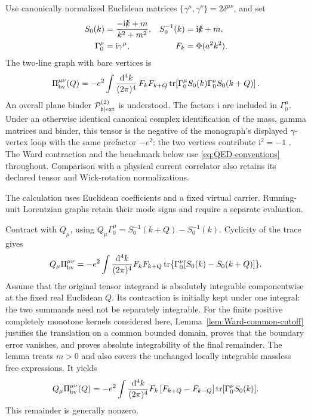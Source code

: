 \documentclass[final,5p,times,twocolumn,numbers,nopreprintline]{elsarticle}
\numberwithin{equation}{section}
\theoremstyle{definition}
\theoremstyle{remark}
\newcommand{\dd}{\mathop{}\!\mathrm d}
\newcommand{\ii}{\mathrm i}
\newcommand{\bb}{\mathfrak b}
\newcommand{\Ph}{\Phi}
\newcommand{\Tr}{\operatorname{tr}}
\begin{document}
Use canonically normalized Euclidean matrices
\(\{\gamma^\mu,\gamma^\nu\}=2\delta^{\mu\nu}\), and set
\begin{equation}
\begin{aligned}
 S_0(k)&=\frac{-\ii\slashed k+m}{k^2+m^2},&
 S_0^{-1}(k)&=\ii\slashed k+m,\\
 \Gamma_0^\mu&=\ii\gamma^\mu,&
 F_k&=\Ph(a^2k^2).
\end{aligned}
 \label{eq:QED-conventions}
\end{equation}
The two-line graph with bare vertices is
\begin{equation}
 \Pi_{\rm bv}^{\mu\nu}(Q)
 =-e^2\int\frac{\dd^4k}{(2\pi)^4}\,
 F_kF_{k+Q}
 \Tr\!\left[\Gamma_0^\mu S_0(k)
                 \Gamma_0^\nu S_0(k+Q)\right].
 \label{eq:bare-QED-loop}
\end{equation}
An overall plane binder
\(\mathcal P^{(2)}_{\bb\mid{\rm ext}}\) is understood.
The factors \(\ii\) are included in \(\Gamma_0^\mu\).
Under an otherwise identical canonical complex identification of
the mass, gamma matrices and binder, this tensor is the negative
of the monograph's displayed \(\gamma\)-vertex loop with the
same prefactor \(-e^2\): the two vertices contribute
\(\ii^2=-1\) \cite{ChiapponeMonograph}.
The Ward contraction and the benchmark below use
\eqref{eq:QED-conventions} throughout. Comparison with a physical
current correlator also retains its declared tensor and
Wick-rotation normalizations.

The calculation uses Euclidean coefficients and a fixed virtual
carrier. Running-unit Lorentzian graphs retain their mode signs
and require a separate evaluation.

Contract with \(Q_\mu\), using
\(Q_\mu\Gamma_0^\mu=S_0^{-1}(k+Q)-S_0^{-1}(k)\).
Cyclicity of the trace gives
\[
 Q_\mu\Pi_{\rm bv}^{\mu\nu}
 =-e^2\int\frac{\dd^4k}{(2\pi)^4}F_kF_{k+Q}
  \Tr\{\Gamma_0^\nu[S_0(k)-S_0(k+Q)]\}.
\]
Assume that the original tensor integrand is absolutely integrable
componentwise at the fixed real Euclidean \(Q\). Its contraction
is initially kept under one integral: the two summands need not
be separately integrable. For the finite positive completely
monotone kernels considered here, Lemma~\ref{lem:Ward-common-cutoff}
justifies the translation on a common bounded domain, proves that
the boundary error vanishes, and proves absolute integrability of
the final remainder. The lemma treats \(m>0\) and also covers
the unchanged locally integrable massless free expressions. It yields
\begin{equation}
 Q_\mu\Pi_{\rm bv}^{\mu\nu}(Q)
 =-e^2\int\frac{\dd^4k}{(2\pi)^4}
 F_k\,[F_{k+Q}-F_{k-Q}]
           \Tr[\Gamma_0^\nu S_0(k)].
 \label{eq:Ward-remainder}
\end{equation}
This remainder is generally nonzero.
\end{document}
